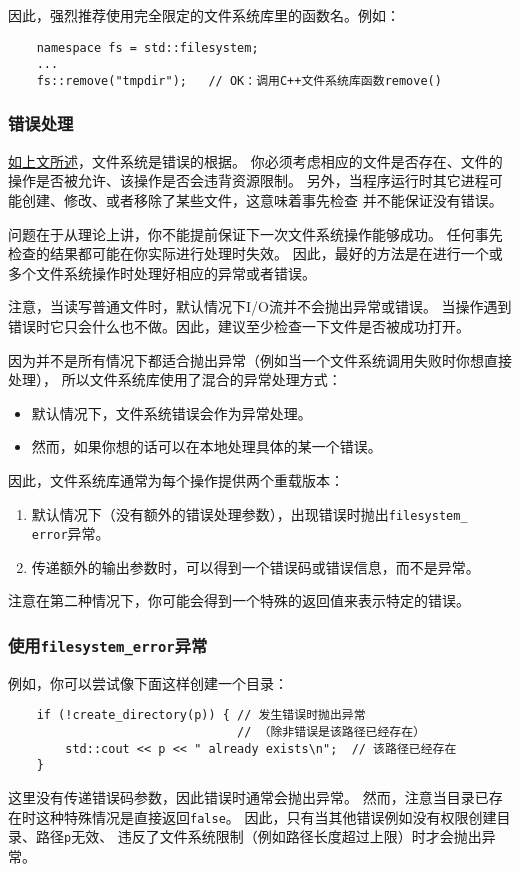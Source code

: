 因此，强烈推荐使用完全限定的文件系统库里的函数名。例如：
\begin{lstlisting}
    namespace fs = std::filesystem;
    ...
    fs::remove("tmpdir");   // OK：调用C++文件系统库函数remove()
\end{lstlisting}

\subsubsection{错误处理}
\hyperref[ch20.1.3.6]{如上文所述}，文件系统是错误的根据。
你必须考虑相应的文件是否存在、文件的操作是否被允许、该操作是否会违背资源限制。
另外，当程序运行时其它进程可能创建、修改、或者移除了某些文件，这意味着事先检查
并不能保证没有错误。

问题在于从理论上讲，你不能提前保证下一次文件系统操作能够成功。
任何事先检查的结果都可能在你实际进行处理时失效。
因此，最好的方法是在进行一个或多个文件系统操作时处理好相应的异常或者错误。

注意，当读写普通文件时，默认情况下I/O流并不会抛出异常或错误。
当操作遇到错误时它只会什么也不做。因此，建议至少检查一下文件是否被成功打开。

因为并不是所有情况下都适合抛出异常（例如当一个文件系统调用失败时你想直接处理），
所以文件系统库使用了混合的异常处理方式：
\begin{itemize}[leftmargin=*]
    \item 默认情况下，文件系统错误会作为异常处理。
    \item 然而，如果你想的话可以在本地处理具体的某一个错误。
\end{itemize}
因此，文件系统库通常为每个操作提供两个重载版本：
\begin{enumerate}[leftmargin=*]
    \item 默认情况下（没有额外的错误处理参数），出现错误时抛出\texttt{filesystem\_\\
    error}异常。
    \item 传递额外的输出参数时，可以得到一个错误码或错误信息，而不是异常。
\end{enumerate}
注意在第二种情况下，你可能会得到一个特殊的返回值来表示特定的错误。

\subsubsection*{使用\texttt{filesystem\_error}异常}
例如，你可以尝试像下面这样创建一个目录：
\begin{lstlisting}
    if (!create_directory(p)) { // 发生错误时抛出异常
                                // （除非错误是该路径已经存在）
        std::cout << p << " already exists\n";  // 该路径已经存在
    }
\end{lstlisting}
这里没有传递错误码参数，因此错误时通常会抛出异常。
然而，注意当目录已存在时这种特殊情况是直接返回\texttt{false}。
因此，只有当其他错误例如没有权限创建目录、路径\texttt{p}无效、
违反了文件系统限制（例如路径长度超过上限）时才会抛出异常。

